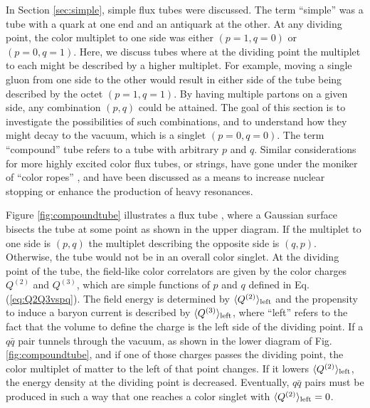 \documentclass[aps, prc, 12pt, nofootinbib, showpacs, superscriptaddress, tightenlines, groupedaddress]{revtex4-2}
\begin{document}
In Section \ref{sec:simple}, simple flux tubes were discussed. The term ``simple'' was a tube with a quark at one end and an antiquark at the other. At any dividing point, the color multiplet to one side was either $(p=1,q=0)$ or $(p=0,q=1)$. Here, we discuss tubes where at the dividing point the multiplet to each might be described by a higher multiplet. For example, moving a single gluon from one side to the other would result in either side of the tube being described by the octet $(p=1,q=1)$. By having multiple partons on a given side, any combination $(p,q)$ could be attained. The goal of this section is to investigate the possibilities of such combinations, and to understand how they might decay to the vacuum, which is a singlet $(p=0,q=0)$. The term ``compound'' tube refers to a tube with arbitrary $p$ and $q$. Similar considerations for more highly excited color flux tubes, or strings, have gone under the moniker of ``color ropes'' \cite{Sorge:1995dp,Bierlich:2014xba,Goswami:2019mta,Andersson:1991er}, and have been discussed as a means to increase nuclear stopping or enhance the production of heavy resonances.

Figure \ref{fig:compoundtube} illustrates a flux tube , where a Gaussian surface bisects the tube at some point as shown in the upper diagram. If the multiplet to one side is $(p,q)$ the multiplet describing the opposite side is $(q,p)$. Otherwise, the tube would not be in an overall color singlet. At the dividing point of the tube, the field-like color correlators are given by the color charges $Q^{(2)}$ and $Q^{(3)}$, which are simple functions of $p$ and $q$ defined in Eq. (\ref{eq:Q2Q3vspq}). The field energy is determined by $\langle Q^{(2)}\rangle_{\rm left}$ and the propensity to induce a baryon current is described by $\langle Q^{(3)}\rangle_{\rm left}$, where ``left'' refers to the fact that the volume to define the charge is the left side of the dividing point. If a $q\bar{q}$ pair tunnels through the vacuum, as shown in the lower diagram of Fig. \ref{fig:compoundtube}, and if one of those charges passes the dividing point, the color multiplet of matter to the left of that point changes. If it lowers $\langle Q^{(2)}\rangle_{\rm left}$, the energy density at the dividing point is decreased. Eventually, $q\bar{q}$ pairs must be produced in such a way that one reaches a color singlet with $\langle Q^{(2)}\rangle_{\rm left}=0$.
\end{document}
